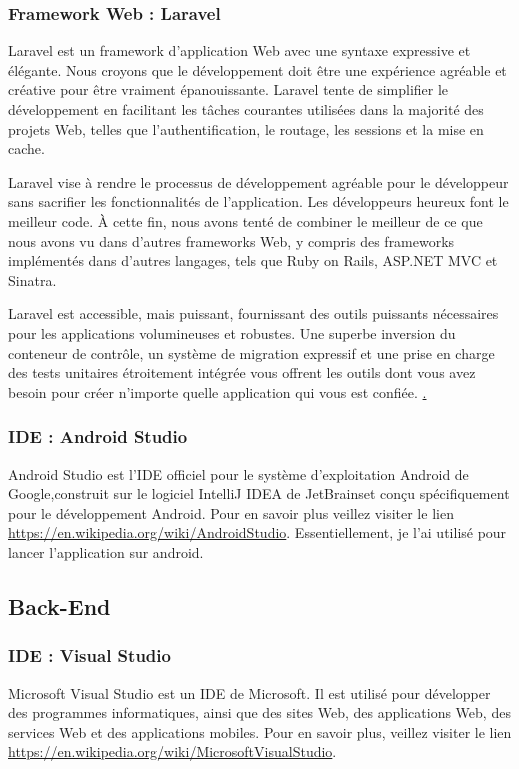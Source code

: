 \subsubsection{Framework Web :  Laravel}
\label{Laravel}
Laravel est un framework d'application Web avec une syntaxe expressive et élégante. Nous croyons que le développement doit être une expérience agréable et créative pour être vraiment épanouissante. Laravel tente de simplifier le développement en facilitant les tâches courantes utilisées dans la majorité des projets Web, telles que l'authentification, le routage, les sessions et la mise en cache.

Laravel vise à rendre le processus de développement agréable pour le développeur sans sacrifier les fonctionnalités de l'application. Les développeurs heureux font le meilleur code. À cette fin, nous avons tenté de combiner le meilleur de ce que nous avons vu dans d'autres frameworks Web, y compris des frameworks implémentés dans d'autres langages, tels que Ruby on Rails, ASP.NET MVC et Sinatra.

Laravel est accessible, mais puissant, fournissant des outils puissants nécessaires pour les applications volumineuses et robustes. Une superbe inversion du conteneur de contrôle, un système de migration expressif et une prise en charge des tests unitaires étroitement intégrée vous offrent les outils dont vous avez besoin pour créer n'importe quelle application qui vous est confiée.
\href{https://laravel.com/docs/4.2/introduction#laravel-philosophy}.
\subsubsection{IDE : Android Studio}
Android Studio est l’IDE officiel pour le système d’exploitation Android de Google,construit sur le logiciel IntelliJ IDEA de JetBrainset conçu spécifiquement pour le développement Android. Pour en savoir plus veillez visiter le lien \newline \href{https://en.wikipedia.org/wiki/Android_Studio}{https://en.wikipedia.org/wiki/AndroidStudio}. \newline
Essentiellement, je l'ai utilisé pour lancer l'application sur android.
\subsection{Back-End}
\subsubsection{IDE : Visual Studio}
Microsoft Visual Studio est un IDE de Microsoft. Il est utilisé pour développer des programmes informatiques, ainsi que des sites Web, des applications Web, des services Web et des applications mobiles. Pour en savoir plus, veillez visiter le lien \href{https://en.wikipedia.org/wiki/Microsoft_Visual_Studio}{https://en.wikipedia.org/wiki/MicrosoftVisualStudio}.
